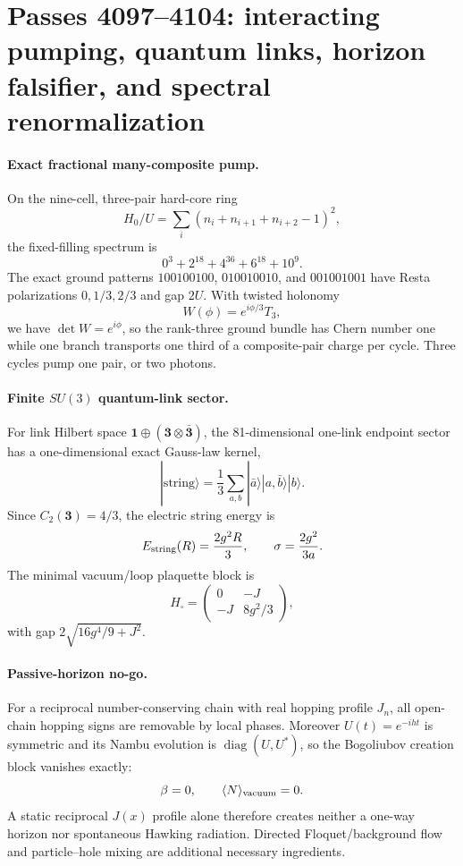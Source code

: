 \section{Passes 4097--4104: interacting pumping, quantum links, horizon falsifier, and spectral renormalization}
\label{sec:passes4097-4104}

\paragraph{Exact fractional many-composite pump.}
On the nine-cell, three-pair hard-core ring
\[
H_0/U=\sum_i(n_i+n_{i+1}+n_{i+2}-1)^2,
\]
the fixed-filling spectrum is
\[
0^3+2^{18}+4^{36}+6^{18}+10^9.
\]
The exact ground patterns $100100100$, $010010010$, and $001001001$ have Resta polarizations $0,1/3,2/3$ and gap $2U$.  With twisted holonomy
\[
W(\phi)=e^{i\phi/3}T_3,
\]
we have $\det W=e^{i\phi}$, so the rank-three ground bundle has Chern number one while one branch transports one third of a composite-pair charge per cycle.  Three cycles pump one pair, or two photons.

\paragraph{Finite $SU(3)$ quantum-link sector.}
For link Hilbert space $\mathbf1\oplus(\mathbf3\otimes\bar{\mathbf3})$, the 81-dimensional one-link endpoint sector has a one-dimensional exact Gauss-law kernel,
\[
|\mathrm{string}\rangle=\frac13\sum_{a,b}|\bar a\rangle|a,\bar b\rangle|b\rangle.
\]
Since $C_2(\mathbf3)=4/3$, the electric string energy is
\[
E_{\rm string}(R)=\frac{2g^2R}{3},
\qquad \sigma=\frac{2g^2}{3a}.
\]
The minimal vacuum/loop plaquette block is
\[
H_\square=\begin{pmatrix}0&-J\\-J&8g^2/3\end{pmatrix},
\]
with gap $2\sqrt{16g^4/9+J^2}$.

\paragraph{Passive-horizon no-go.}
For a reciprocal number-conserving chain with real hopping profile $J_n$, all open-chain hopping signs are removable by local phases.  Moreover $U(t)=e^{-iht}$ is symmetric and its Nambu evolution is $\operatorname{diag}(U,U^*)$, so the Bogoliubov creation block vanishes exactly:
\[
\beta=0,
\qquad \langle N\rangle_{\rm vacuum}=0.
\]
A static reciprocal $J(x)$ profile alone therefore creates neither a one-way horizon nor spontaneous Hawking radiation.  Directed Floquet/background flow and particle--hole mixing are additional necessary ingredients.

